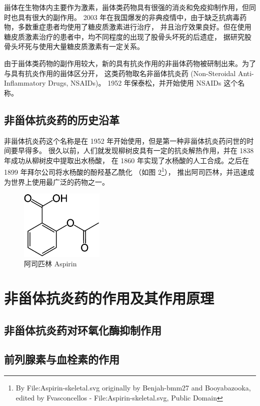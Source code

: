 \documentclass[12pt, a4paper, oneside]{ctexart}
\begin{document}
甾体在生物体内主要作为激素，甾体类药物具有很强的消炎和免疫抑制作用，但同时也具有很大的副作用。
2003 年在我国爆发的非典疫情中，由于缺乏抗病毒药物，多数重症患者均使用了糖皮质激素进行治疗，
并且治疗效果良好。但在使用糖皮质激素治疗的患者中，均不同程度的出现了股骨头坏死的后遗症，
据研究股骨头坏死与使用大量糖皮质激素有一定关系\cite{ref2}。

由于甾体类药物的副作用较大，新的具有抗炎作用的非甾体药物被研制出来。为了与具有抗炎作用的甾体区分开，
这类药物取名非甾体抗炎药 (Non-Steroidal Anti-Inflammatory Drugs, NSAIDs)。
1952 年保泰松，并开始使用 NSAIDs 这个名称。

\subsection{非甾体抗炎药的历史沿革}
非甾体抗炎药这个名称是在 1952 年开始使用，但是第一种非甾体抗炎药问世的时间要早得多。
很久以前，人们就发现柳树皮具有一定的抗炎解热作用，并在 1838 年成功从柳树皮中提取出水杨酸，
在 1860 年实现了水杨酸的人工合成。之后在 1899 年拜尔公司将水杨酸的酚羟基乙酰化
（如图 2\footnote{By File:Aspirin-skeletal.svg originally by Benjah-bmm27 and Booyabazooka, edited by Fvasconcellos - File:Aspirin-skeletal.svg, Public Domain}），
推出阿司匹林，并迅速成为世界上使用最广泛的药物之一。

\begin{figure}[htbp]
    \centering
    \includegraphics[width=4cm]{Aspirin-skeletal.pdf}
    \caption{阿司匹林 Aspirin}
    \end{figure}

\newpage
\section{非甾体抗炎药的作用及其作用原理}
\subsection{非甾体抗炎药对环氧化酶抑制作用}

\subsection{前列腺素与血栓素的作用}
\end{document}

